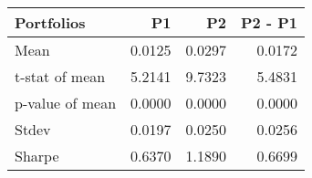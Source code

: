 \begin{tabular}{lrrr}
\toprule
Portfolios & P1 & P2 & P2 - P1 \\
\midrule
Mean & 0.0125 & 0.0297 & 0.0172 \\
t-stat of mean & 5.2141 & 9.7323 & 5.4831 \\
p-value of mean & 0.0000 & 0.0000 & 0.0000 \\
Stdev & 0.0197 & 0.0250 & 0.0256 \\
Sharpe & 0.6370 & 1.1890 & 0.6699 \\
\bottomrule
\end{tabular}
